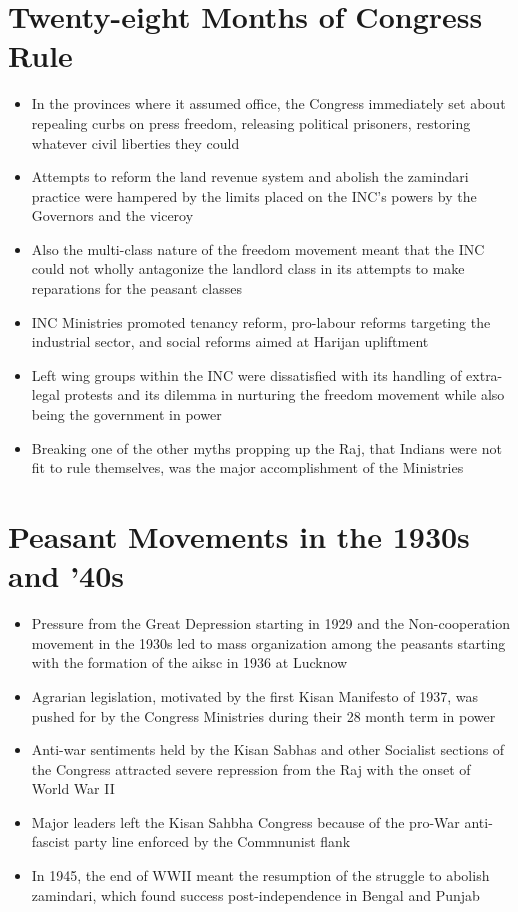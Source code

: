 \section{Twenty-eight Months of Congress Rule}
\begin{itemize}
    \item In the provinces where it assumed office, the Congress immediately set about repealing curbs on press freedom, releasing political prisoners, restoring whatever civil liberties they could
    \item Attempts to reform the land revenue system and abolish the zamindari practice were hampered by the limits placed on the INC's powers by the Governors and the viceroy
    \item Also the multi-class nature of the freedom movement meant that the INC could not wholly antagonize the landlord class in its attempts to make reparations for the peasant classes
    \item INC Ministries promoted tenancy reform, pro-labour reforms targeting the industrial sector, and social reforms aimed at Harijan upliftment
    \item Left wing groups within the INC were dissatisfied with its handling of extra-legal protests and its dilemma in nurturing the freedom movement while also being the government in power
    \item Breaking one of the other myths propping up the Raj, that Indians were not fit to rule themselves, was the major accomplishment of the Ministries
\end{itemize}

\section{Peasant Movements in the 1930s and '40s}
\begin{itemize}
    \item Pressure from the Great Depression starting in 1929 and the Non-cooperation movement in the 1930s led to mass organization among the peasants starting with the formation of the \acrshort{aiksc} in 1936 at Lucknow
    \item Agrarian legislation, motivated by the first Kisan Manifesto of 1937, was pushed for by the Congress Ministries during their 28 month term in power
    \item Anti-war sentiments held by the Kisan Sabhas and other Socialist sections of the Congress attracted severe repression from the Raj with the onset of World War II
    \item Major leaders left the Kisan Sahbha Congress because of the pro-War anti-fascist party line enforced by the Commnunist flank
    \item In 1945, the end of WWII meant the resumption of the struggle to abolish zamindari, which found success post-independence in Bengal and Punjab
\end{itemize}

